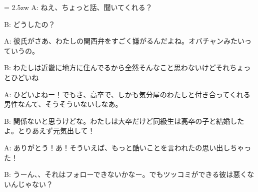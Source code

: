 \documentclass[11pt]{amsart}
\title{}
\author{}
\newenvironment{hangall}[1]{\hangindent = 2.5zw\everypar{\hangindent = 2.5zw}}{}
\begin{document}
\maketitle
\begin{hangall}{}%
A: ねえ、ちょっと話、聞いてくれる？



B: どうしたの？



A: 彼氏がさあ、わたしの関西弁をすごく嫌がるんだよね。オバチャンみたいっていうの。



B: わたしは近畿に地方に住んでるから全然そんなこと思わないけどそれちょっとひどいね



A: ひどいよねー！でもさ、高卒で、しかも気分屋のわたしと付き合ってくれる男性なんて、そうそういないしなあ。



B: 関係ないと思うけどな。わたしは大卒だけど同級生は高卒の子と結婚したよ。とりあえず元気出して！



A: ありがとう！あ！そういえば、もっと酷いことを言われたの思い出しちゃった！



B: うーん、、それはフォローできないかなー。でもツッコミができる彼は悪くないんじゃない？\end{hangall}
\end{document}
